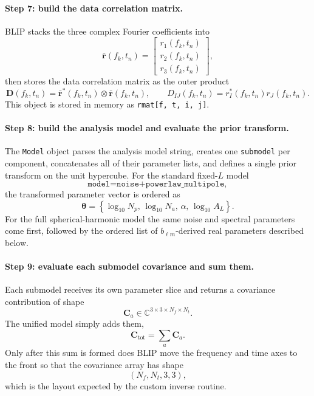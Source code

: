 \documentclass[11pt]{article}
\begin{document}
\paragraph{Step 7: build the data correlation matrix.}
BLIP stacks the three complex Fourier coefficients into
\begin{equation}
\bar{\mathbf{r}}(f_k,t_n)=
\begin{bmatrix}
r_1(f_k,t_n)\\
r_2(f_k,t_n)\\
r_3(f_k,t_n)
\end{bmatrix},
\end{equation}
then stores the data correlation matrix as the outer product
\begin{equation}
\mathbf{D}(f_k,t_n)
=\bar{\mathbf{r}}^\ast(f_k,t_n)\otimes \bar{\mathbf{r}}(f_k,t_n),
\qquad
D_{IJ}(f_k,t_n)=r_I^\ast(f_k,t_n)r_J(f_k,t_n).
\end{equation}
This object is stored in memory as \texttt{rmat[f, t, i, j]}.

\paragraph{Step 8: build the analysis model and evaluate the prior transform.}
The \texttt{Model} object parses the analysis model string, creates one \texttt{submodel} per component, concatenates all of their parameter lists, and defines a single prior transform on the unit hypercube. For the standard fixed-$L$ model
\begin{equation}
\texttt{model=noise+powerlaw\_multipole},
\end{equation}
the transformed parameter vector is ordered as
\begin{equation}
\bm{\theta}=
\left\{
\log_{10}N_p,\,
\log_{10}N_a,\,
\alpha,\,
\log_{10}A_L
\right\}.
\end{equation}
For the full spherical-harmonic model the same noise and spectral parameters come first, followed by the ordered list of $b_{\ell m}$-derived real parameters described below.

\paragraph{Step 9: evaluate each submodel covariance and sum them.}
Each submodel receives its own parameter slice and returns a covariance contribution of shape
\begin{equation}
\mathbf{C}_a\in\mathbb{C}^{3\times 3\times N_f\times N_t}.
\end{equation}
The unified model simply adds them,
\begin{equation}
\mathbf{C}_{\mathrm{tot}}
=\sum_a \mathbf{C}_a.
\end{equation}
Only after this sum is formed does BLIP move the frequency and time axes to the front so that the covariance array has shape
\begin{equation}
(N_f,N_t,3,3),
\end{equation}
which is the layout expected by the custom inverse routine.
\end{document}
